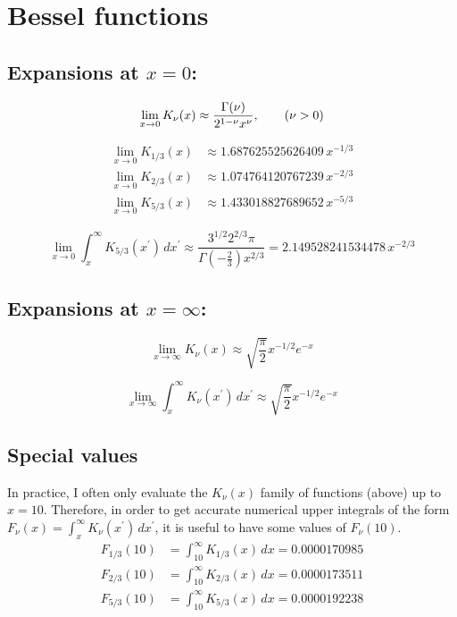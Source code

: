 \documentclass{book}
\begin{document}
\section{Bessel functions}

\subsection{Expansions at $x=0$:}

\begin{equation}
    \lim_{x\rightarrow0} K_\nu(x)
        \approx \frac{\Gamma(\nu)}{2^{1-\nu}x^\nu}, \qquad (\nu > 0) \\
\end{equation}

\begin{align}
    \lim_{x\rightarrow0} K_{1/3}(x)
        &\approx 1.687625525626409\,x^{-1/3} \\
    \lim_{x\rightarrow0} K_{2/3}(x)
        &\approx 1.074764120767239\,x^{-2/3} \\
    \lim_{x\rightarrow0} K_{5/3}(x)
        &\approx 1.433018827689652\,x^{-5/3}
\end{align}

\begin{equation}
    \lim_{x\rightarrow0} \int_x^\infty K_{5/3}(x^\prime)\,dx^\prime
        \approx \frac{3^{1/2}2^{2/3}\pi}{\Gamma\left(-\frac23\right)x^{2/3}} = 2.149528241534478\,x^{-2/3}
\end{equation}

\subsection{Expansions at $x=\infty$:}

\begin{equation}
    \lim_{x\rightarrow\infty} K_\nu(x)
        \approx \sqrt{\frac{\pi}{2}}x^{-1/2}e^{-x}
\end{equation}

\begin{equation}
    \lim_{x\rightarrow\infty} \int_x^\infty K_\nu(x^\prime)\,dx^\prime
        \approx \sqrt{\frac{\pi}{2}}x^{-1/2}e^{-x}
\end{equation}

\subsection{Special values}

In practice, I often only evaluate the $K_\nu(x)$ family of functions (above) up to $x = 10$.
Therefore, in order to get accurate numerical upper integrals of the form $F_\nu(x) = \int_x^\infty K_\nu(x^\prime)\,dx^\prime$, it is useful to have some values of $F_\nu(10)$.
\begin{align}
    F_{1/3}(10) &= \int_{10}^\infty K_{1/3}(x)\,dx = 0.0000170985 \\
    F_{2/3}(10) &= \int_{10}^\infty K_{2/3}(x)\,dx = 0.0000173511 \\
    F_{5/3}(10) &= \int_{10}^\infty K_{5/3}(x)\,dx = 0.0000192238
\end{align}
\end{document}
